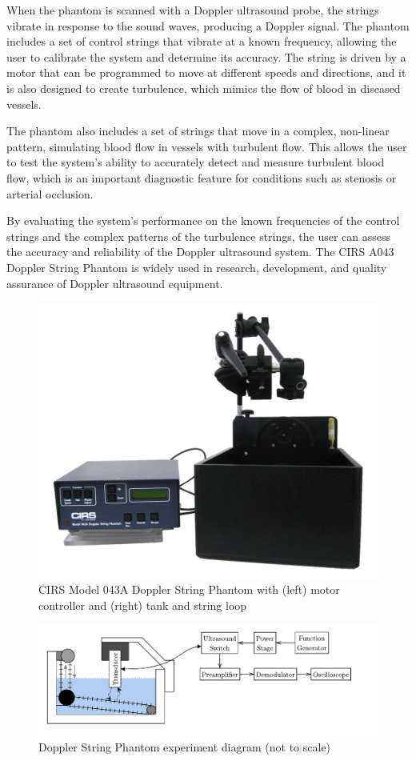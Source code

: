 When the phantom is scanned with a Doppler ultrasound probe, the strings vibrate in response to the sound waves, producing a Doppler signal. The phantom includes a set of control strings that vibrate at a known frequency, allowing the user to calibrate the system and determine its accuracy. The string is driven by a motor that can be programmed to move at different speeds and directions, and it is also designed to create turbulence, which mimics the flow of blood in diseased vessels.

The phantom also includes a set of strings that move in a complex, non-linear pattern, simulating blood flow in vessels with turbulent flow. This allows the user to test the system's ability to accurately detect and measure turbulent blood flow, which is an important diagnostic feature for conditions such as stenosis or arterial occlusion.

By evaluating the system's performance on the known frequencies of the control strings and the complex patterns of the turbulence strings, the user can assess the accuracy and reliability of the Doppler ultrasound system. The CIRS A043 Doppler String Phantom is widely used in research, development, and quality assurance of Doppler ultrasound equipment.
\begin{figure}[htbp]
	\centering
	\includegraphics[width=.8\textwidth]{Figures/5_cirs_043a_image.jpg}
	\caption[CIRS Model 043A Doppler String Phantom]{CIRS Model 043A Doppler String Phantom with (left) motor controller and (right) tank and string loop}
\end{figure}

\begin{figure}[htbp]
	\centering
	\includegraphics[width=.8\textwidth]{Figures/5_doppler_string_phantom_experiment.pdf}
	\caption{Doppler String Phantom experiment diagram (not to scale)}
	\label{fig:5_doppler_string_experiment}
\end{figure}

